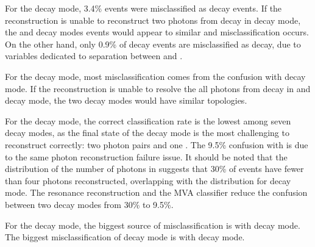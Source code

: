
For the \decayPionShort decay mode, 3.4\% events were misclassified as \decayRhoShortest decay events. If the reconstruction is unable to reconstruct two photons from \Ppizero decay in \decayRhoShortest decay mode, the \decayPionShort and \decayRhoShortest decay modes events would appear to  similar and misclassification occurs. On the other hand, only 0.9\% of \decayPionShort decay events are misclassified as \decayElectronShort decay, due to variables dedicated to separation between \Pem and \Ppiminus.



For the \decayRhoShortest decay mode, most misclassification comes from the confusion with \decayAiPhotonShortest decay mode.  If the reconstruction is unable to resolve the all photons from \Ppizero decay in \decayRhoShortest and \decayAiPhotonShortest decay mode, the two decay modes would have similar topologies.

For the \decayAiPhotonShortest decay mode, the correct classification rate is the lowest among seven decay modes, as the final state of the \decayAiPhotonShortest decay mode is the most challenging to reconstruct correctly: two photon pairs and  one \Ppipm. The 9.5\% confusion with \decayRhoShortest is due to the same photon reconstruction failure issue. It should be noted that the distribution of the number of photons in  suggests that 30\% of \decayAiPhotonShortest events have fewer than four photons reconstructed, overlapping with the distribution for \decayRhoShortest decay mode. The \decayAiPhotonShortest resonance reconstruction and the MVA \multiclass classifier reduce the confusion between two decay modes from 30\% to  9.5\%.

For the \decayAiPionShortest decay mode, the biggest source of misclassification is with \decayThreePionPhotonShort decay mode. The biggest misclassification of  \decayThreePionPhotonShort decay mode  is with \decayAiPionShortest decay mode.

